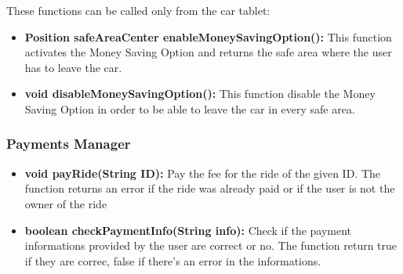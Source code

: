 These functions can be called only from the car tablet:
\begin{itemize}
	\item \textbf{Position safeAreaCenter enableMoneySavingOption():} This function activates the Money Saving Option and returns the safe area where the user has to leave the car.
	\item \textbf{void disableMoneySavingOption():} This function disable the Money Saving Option in order to be able to leave the car in every safe area.
\end{itemize}

\subsubsection{Payments Manager}
\begin{itemize}
	\item \textbf{void payRide(String ID):} Pay the fee for the ride of the given ID. The function returns an error if the ride was already paid or if the user is not the owner of the ride
	\item \textbf{boolean checkPaymentInfo(String info):} Check if the payment informations provided by the user are correct or no. The function return true if they are correc, false if there's an error in the informations.
\end{itemize}



